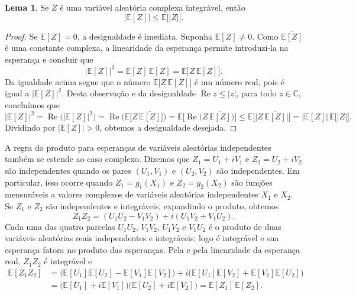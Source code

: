\documentclass[12pt,portuguese]{article}
\theoremstyle{definition}
\newtheorem{lemma}[lemma]{Lema}
\theoremstyle{plainexercise}
\theoremstyle{starredexercise}
\theoremstyle{definition}
\begin{document}
\begin{lemma}\label{lem:esperanca-modulo}
Se $Z$ é uma variável aleatória complexa integrável, então
\[
\bigl|\mathbb{E}[Z]\bigr|\leqslant \mathbb{E}\bigl[|Z|\bigr].
\]
\end{lemma}

\begin{proof}
Se $\mathbb{E}[Z]=0$, a desigualdade é imediata. Suponha $\mathbb{E}[Z]\neq0$.
Como $\overline{\mathbb{E}[Z]}$ é uma constante complexa, a linearidade da
esperança permite introduzi-la na esperança e concluir que
\[
\bigl|\mathbb{E}[Z]\bigr|^2
=\mathbb{E}[Z]\,\overline{\mathbb{E}[Z]}
=\mathbb{E}\bigl[Z\,\overline{\mathbb{E}[Z]}\bigr].
\]
Da igualdade acima segue que o número $\mathbb{E}\bigl[Z\,\overline{\mathbb{E}[Z]}\bigr]$ é 
um número real, pois é igual a $\bigl|\mathbb{E}[Z]\bigr|^2$. Desta observação e da desigualdade
$\operatorname{Re}z\leqslant|z|$, para todo $z\in\mathbb{C}$, concluímos que
\[
\bigl|\mathbb{E}[Z]\bigr|^2 
=
\operatorname{Re}\bigl(\bigl|\mathbb{E}[Z]\bigr|^2 \bigr)
=
\operatorname{Re}\bigl( \mathbb{E}\bigl[Z\,\overline{\mathbb{E}[Z]}\bigr]\bigr)
=
\mathbb{E}\bigl[\operatorname{Re}\bigl(Z\,\overline{\mathbb{E}[Z]}\bigr)\bigr]
\leqslant\mathbb{E}\bigl[\bigl|Z\,\overline{\mathbb{E}[Z]}\bigr|\bigr]
=\bigl|\mathbb{E}[Z]\bigr|\,\mathbb{E}\bigl[|Z|\bigr].
\]
Dividindo por $\bigl|\mathbb{E}[Z]\bigr|>0$, obtemos a desigualdade desejada.
\end{proof}

A regra do produto para esperanças de variáveis aleatórias independentes também
se estende ao caso complexo. Dizemos que $Z_1=U_1+iV_1$ e $Z_2=U_2+iV_2$ são
independentes quando os pares $(U_1,V_1)$ e $(U_2,V_2)$ são independentes.
Em particular, isso ocorre quando $Z_1=g_1(X_1)$ e
$Z_2=g_2(X_2)$ são funções mensuráveis a valores complexos de variáveis
aleatórias independentes $X_1$ e $X_2$. Se $Z_1$ e $Z_2$ são independentes e
integráveis, expandindo o produto, obtemos
\[
Z_1Z_2=(U_1U_2-V_1V_2)+i(U_1V_2+V_1U_2).
\]
Cada uma das quatro parcelas $U_1U_2$, $V_1V_2$, $U_1V_2$ e $V_1U_2$ é o produto
de duas variáveis aleatórias reais independentes e integráveis; logo é
integrável e sua esperança fatora no produto das esperanças. Pela
 e pela linearidade da esperança real, $Z_1Z_2$ é
integrável e
\begin{align*}
\mathbb{E}[Z_1Z_2]
&=\bigl(\mathbb{E}[U_1]\mathbb{E}[U_2]-\mathbb{E}[V_1]\mathbb{E}[V_2]\bigr)
  +i\bigl(\mathbb{E}[U_1]\mathbb{E}[V_2]+\mathbb{E}[V_1]\mathbb{E}[U_2]\bigr)
\\[0.2cm]
&=\bigl(\mathbb{E}[U_1]+i\mathbb{E}[V_1]\bigr)
  \bigl(\mathbb{E}[U_2]+i\mathbb{E}[V_2]\bigr)
=\mathbb{E}[Z_1]\,\mathbb{E}[Z_2].
\end{align*}
\end{document}
